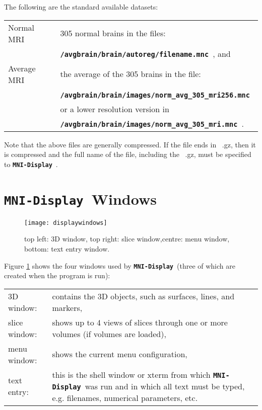 \documentclass{article}
\newcommand{\ident}[1]{{\bf\tt #1}\ }
\newcommand{\display}{\ident{MNI-Display}}
\begin{document}
The following are the standard available datasets:
\vspace{.5cm}

\begin{tabular}[t]{p{2.1cm}p{9cm}}
Normal MRI  & 305 normal brains in the files: \\
            & \ident{/avgbrain/brain/autoreg/\-filename.mnc}, and \\
Average MRI & the average of the 305 brains in the file: \\
            & \ident{/avgbrain/brain/images/norm\_avg\_305\_mri256.mnc} \\
            & or a lower resolution version in \\
            & \ident{/avgbrain/brain/images/\-norm\_avg\_305\_mri.mnc}.
\end{tabular}

\vspace{.5cm}

Note that the above files are generally compressed.  If the file ends in
\ .gz, then it is compressed and the full name of the file, including the
\ .gz, must be specified to \display.

\section{\display Windows}

\begin{figure}
\texttt{[image: displaywindows]}
\caption{top left: 3D window, top right: slice window,centre: menu
  window, bottom: text entry window.}
\label{windows}
\end{figure}

Figure \ref{windows} shows the four windows used by \display (three of which
are created when the program is run):

\vspace{.5cm}

\begin{tabular}[t]{p{3cm}p{7cm}}
3D window:  &  contains the 3D objects, such as surfaces, lines,
                  and markers, \\
slice window:  &  shows up to 4 views of slices through one or more volumes
                      (if volumes are loaded), \\
menu window:  &  shows the current menu configuration, \\
text entry:  &  this is the shell window or xterm from which \display was
                   run and in which all text must be typed, e.g. filenames,
                   numerical parameters, etc.
\end{tabular}
\end{document}
